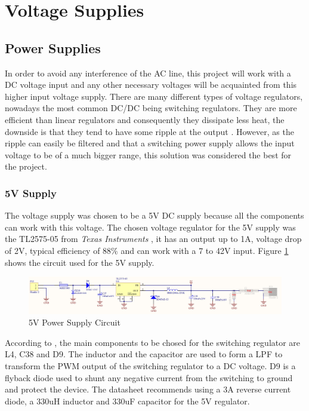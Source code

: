 \section{Voltage Supplies}\label{sec:voltage-supplies}

	\subsection{Power Supplies}\label{ssec:power-supplies}
		In order to avoid any interference of the AC line, this project will work with a DC voltage input and any other necessary voltages will be acquainted from this higher input voltage supply. There are many different types of voltage regulators, nowadays the most common DC/DC being switching regulators. They are more efficient than linear regulators and consequently they dissipate less heat, the downside is that they tend to have some ripple at the output \cite{schweber2017}. However, as the ripple can easily be filtered and that a switching power supply allows the input voltage to be of a much bigger range, this solution was considered the best for the project. 

		\subsubsection{5V Supply}\label{sssec:5v-supply}
			The voltage supply was chosen to be a 5V DC supply because all the components can work with this voltage. The chosen voltage regulator for the 5V supply was the TL2575-05 from \textit{Texas Instruments} \cite{tl2575-05-datasheet}, it has an output up to 1A, voltage drop of 2V, typical efficiency of 88$\%$ and can work with a 7 to 42V input. Figure \ref{fig:tl2575-05-circuit} shows the circuit used for the 5V supply.

			\begin{figure}[htbp]
				\centering
					\includegraphics[width=1\textwidth]{figuras/fig-tl2575-05-circuit.png}
				\caption{5V Power Supply Circuit}
				\label{fig:tl2575-05-circuit}
			\end{figure}

			According to \cite{tl2575-05-datasheet}, the main components to be chosed for the switching regulator are L4, C38 and D9. The inductor and the capacitor are used to form a LPF to transform the PWM output of the switching regulator to a DC voltage. D9 is a flyback diode used to shunt any negative current from the switching to ground and protect the device. The datasheet recommends using a 3A reverse current diode, a 330uH inductor and 330uF capacitor for the 5V regulator.

